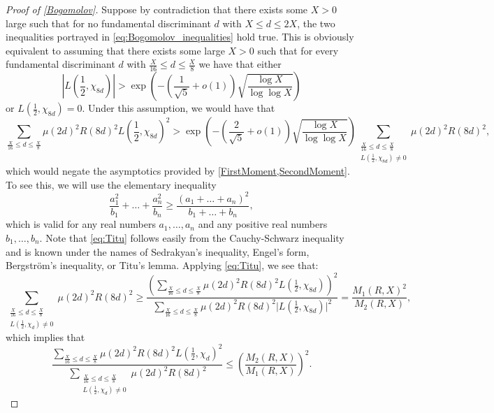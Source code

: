 \documentclass[10pt,a4paper]{amsart}
\theoremstyle{plain}
\theoremstyle{definition}
\theoremstyle{remark}
\begin{document}
\begin{proof}[Proof of \cref{Bogomolov}]
Suppose by contradiction that there exists some $X > 0$ large such that for no fundamental discriminant $d$ with $X \leq d \leq 2 X$, the two inequalities portrayed in \eqref{eq:Bogomolov_inequalities} hold true.
This is obviously equivalent to assuming that there exists some large $X > 0$ such that for every fundamental discriminant $d$ with $\frac{X}{16} \leq d \leq \frac{X}{8}$ we have that either \[
\left\lvert L\left( \frac{1}{2}, \chi_{8 d} \right) \right\rvert > \exp\left( -\left( \frac{1}{\sqrt{5}} + o(1) \right) \sqrt{\frac{\log X}{\log\log X}} \right) \]
or $L\left( \frac{1}{2}, \chi_{8 d} \right) = 0$. Under this assumption, we would have that
\begin{equation} \label{eq:absurd_bound}
    \displaystyle{\sum_{\frac{X}{16}\leq d\leq \frac{X}{8}}\mu(2d)^2R(8d)^2L\left(\frac{1}{2},\chi_{8d}\right)^2} > \exp\left(- \left(\frac{2}{\sqrt{5}}+o(1)\right)\sqrt{\frac{\log X}{\log\log X}}\right) 
\displaystyle{\sum_{\substack{\frac{X}{16}\leq d\leq \frac{X}{8}\\ L\left(\frac{1}{2},\chi_{8d}\right)\neq 0 }}\mu(2d)^2R(8d)^2},
\end{equation}
which would negate the asymptotics provided by \cref{FirstMoment,SecondMoment}. To see this, we will use the elementary inequality
\begin{equation} \label{eq:Titu}
    \frac{a_1^2}{b_1} + \dots + \frac{a_n^2}{b_n} \geq \frac{(a_1+\dots+a_n)^2}{b_1+\dots+b_n},
\end{equation}
which is valid for any real numbers $a_1,\dots,a_n$ and any positive real numbers $b_1,\dots,b_n$. Note that \eqref{eq:Titu} follows easily from the Cauchy-Schwarz inequality and is known under the names of Sedrakyan's inequality, Engel's form, Bergström's inequality, or Titu's lemma.
Applying \eqref{eq:Titu}, we see that:
\[
\displaystyle{\sum_{\substack{\frac{X}{16}\leq d\leq \frac{X}{8}\\ L\left(\frac{1}{2},\chi_d\right)\neq 0 }}\mu(2d)^2R(8d)^2}\geq \frac{\displaystyle{\left(\sum_{\frac{X}{16}\leq d\leq \frac{X}{8}}\mu(2d)^2R(8d)^2L\left(\frac{1}{2},\chi_{8d}\right)\right)^2}}{\displaystyle{\sum_{\frac{X}{16}\leq d\leq \frac{X}{8}}\mu(2d)^2R(8d)^2\Big|L\left(\frac{1}{2},\chi_{8d}\right)\Big|^2}}=\frac{M_1(R,X)^2}{M_2(R,X)},
\]
which implies that
\begin{equation}\label{principal2}
\frac{\displaystyle{\sum_{\frac{X}{16}\leq d\leq \frac{X}{8}}\mu(2d)^2R(8d)^2 L\left(\frac{1}{2},\chi_d\right) ^2}}{\displaystyle{\sum_{\substack{\frac{X}{16}\leq d\leq \frac{X}{8}\\ L\left(\frac{1}{2},\chi_d\right)\neq 0 }}\mu(2d)^2R(8d)^2}}\leq \left(\frac{M_2(R,X)}{M_1(R,X)}\right)^2. 

\end{equation}
\end{proof}
\end{document}
